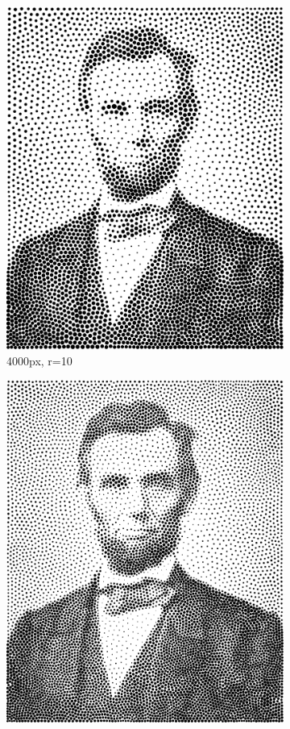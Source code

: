 \documentclass[11pt]{article}
\begin{document}
\begin{figure}[H]
\begin{subfigure}[b]{0.2\linewidth}
		\includegraphics[width=\linewidth]{pix/vr_AL_4000_r10.png}
		\caption{4000px, r=10}
	\end{subfigure}
	\begin{subfigure}[b]{0.2\linewidth}
		\includegraphics[width=\linewidth]{pix/vr_AL_8000_r10.png}

\end{subfigure}
\end{figure}
\end{document}
